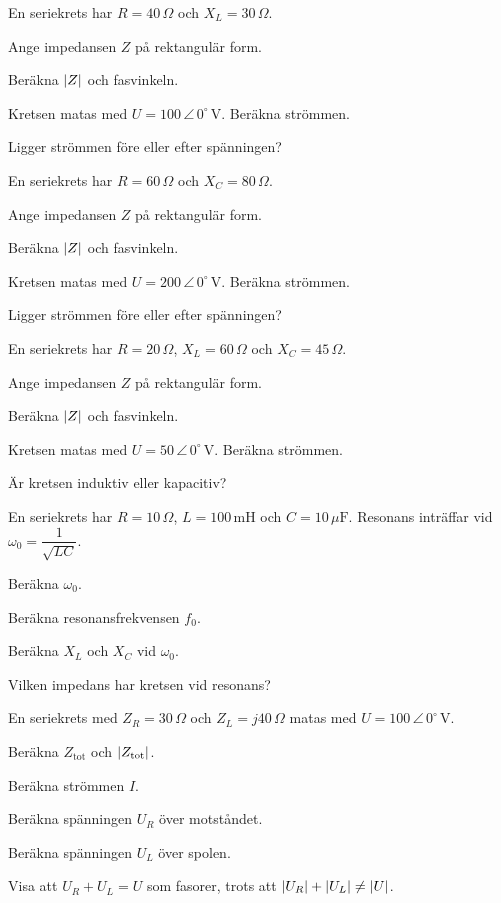 En seriekrets har $R = 40\,\Omega$ och $X_L = 30\,\Omega$.
\begin{parts}
  \item Ange impedansen $Z$ på rektangulär form.
  \item Beräkna $\lvert Z\rvert$ och fasvinkeln.
  \item Kretsen matas med $U = 100\,\angle\,0^{\circ}\,\text{V}$. Beräkna strömmen.
  \item Ligger strömmen före eller efter spänningen?
\end{parts}

En seriekrets har $R = 60\,\Omega$ och $X_C = 80\,\Omega$.
\begin{parts}
  \item Ange impedansen $Z$ på rektangulär form.
  \item Beräkna $\lvert Z\rvert$ och fasvinkeln.
  \item Kretsen matas med $U = 200\,\angle\,0^{\circ}\,\text{V}$. Beräkna strömmen.
  \item Ligger strömmen före eller efter spänningen?
\end{parts}

En seriekrets har $R = 20\,\Omega$, $X_L = 60\,\Omega$ och $X_C = 45\,\Omega$.
\begin{parts}
  \item Ange impedansen $Z$ på rektangulär form.
  \item Beräkna $\lvert Z\rvert$ och fasvinkeln.
  \item Kretsen matas med $U = 50\,\angle\,0^{\circ}\,\text{V}$. Beräkna strömmen.
  \item Är kretsen induktiv eller kapacitiv?
\end{parts}

En seriekrets har $R = 10\,\Omega$, $L = 100\,\text{mH}$ och $C = 10\,\mu\text{F}$. Resonans
inträffar vid $\omega_0 = \dfrac{1}{\sqrt{LC}}$.
\begin{parts}
  \item Beräkna $\omega_0$.
  \item Beräkna resonansfrekvensen $f_0$.
  \item Beräkna $X_L$ och $X_C$ vid $\omega_0$.
  \item Vilken impedans har kretsen vid resonans?
\end{parts}

En seriekrets med $Z_R = 30\,\Omega$ och $Z_L = j40\,\Omega$ matas med
$U = 100\,\angle\,0^{\circ}\,\text{V}$.
\begin{parts}
  \item Beräkna $Z_{\text{tot}}$ och $\lvert Z_{\text{tot}}\rvert$.
  \item Beräkna strömmen $I$.
  \item Beräkna spänningen $U_R$ över motståndet.
  \item Beräkna spänningen $U_L$ över spolen.
  \item Visa att $U_R + U_L = U$ som fasorer, trots att $\lvert U_R\rvert + \lvert U_L\rvert \neq \lvert U\rvert$.
\end{parts}

